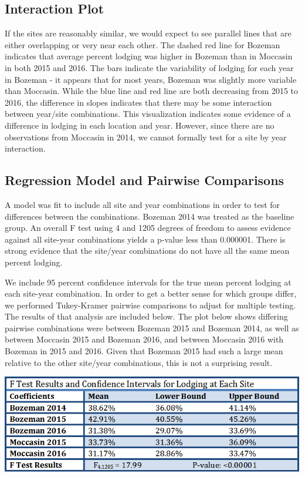\documentclass[11pt]{article}
\begin{document}
\subsection{Interaction Plot}
If the sites are reasonably similar, we would expect to see parallel lines that are either overlapping or very near each other.  The dashed red line for Bozeman indicates that average percent lodging was higher in Bozeman than in Moccasin in both 2015 and 2016.  The bars indicate the variability of lodging for each year in Bozeman - it appears that for most years, Bozeman was slightly more variable than Moccasin. While the blue line and red line are both decreasing from 2015 to 2016, the difference in slopes indicates that there may be some interaction between year/site combinations.  This visualization indicates some evidence of a difference in lodging in each location and year. However, since there are no observations from Moccasin in 2014, we cannot formally test for a site by year interaction. 

\begin{knitrout}\footnotesize
{}\color{fgcolor}\begin{kframe}


{\ttfamily\noindent\bfseries\color{errorcolor}{Error in tapply(response, groups, fun): arguments must have same length}}\end{kframe}
\end{knitrout}

\pagebreak
\subsection{Regression Model and Pairwise Comparisons}
A model was fit to include all site and year combinations in order to test for differences between the combinations. Bozeman 2014 was treated as the baseline group. An overall F test using 4 and 1205 degrees of freedom to assess evidence against all site-year combinations yields a p-value less than 0.000001. There is strong evidence that the site/year combinations do not have all the same mean percent lodging. 
  
We include 95 percent confidence intervals for the true mean percent lodging at each site-year combination. In order to get a better sense for which groups differ, we performed Tukey-Kramer pairwise comparisons to adjust for multiple testing. The results of that analysis are included below. The plot below shows differing pairwise combinations were between Bozeman 2015 and Bozeman 2014, as well as between Moccasin 2015 and Bozeman 2016, and between Moccasin 2016 with Bozeman in 2015 and 2016. Given that Bozeman 2015 had such a large mean relative to the other site/year combinations, this is not a surprising result. 
  
\includegraphics [width = 4.5 in] {RegressionResults}
\end{document}
